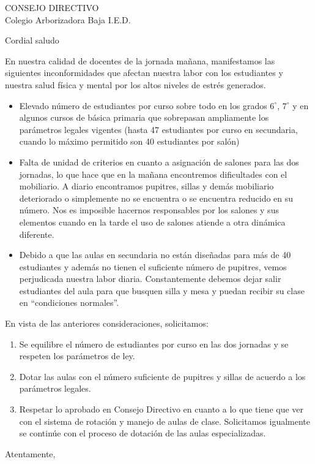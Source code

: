 \documentclass[spanish,11pt]{letter}
\date{26 de febrero de 2015}
\begin{document}
\begin{letter}{CONSEJO DIRECTIVO\\Colegio Arborizadora Baja I.E.D.}
	
\opening{Cordial saludo}
En nuestra calidad de docentes de la jornada mañana, manifestamos las siguientes inconformidades que afectan nuestra labor con los estudiantes y nuestra salud física y mental por los altos niveles de estr\'{e}s generados.
\begin{itemize}
\item Elevado n\'{u}mero de estudiantes por curso sobre todo en los grados $6^{\circ}$, $7^{\circ}$ y en algunos cursos de básica primaria que sobrepasan ampliamente los par\'{a}metros legales vigentes (hasta 47 estudiantes por curso en secundaria, cuando lo m\'{a}ximo permitido son 40 estudiantes por sal\'{o}n)
\item Falta de unidad de criterios en cuanto a asignación de salones para las dos jornadas, lo que hace que en la mañana encontremos dificultades con el mobiliario. A diario encontramos pupitres, sillas y demás mobiliario deteriorado o simplemente no se encuentra o se encuentra reducido en su número. Nos es imposible hacernos responsables por los salones y sus elementos cuando en la tarde el uso de salones atiende a otra dinámica diferente.
\item Debido a que las aulas en secundaria no están diseñadas para más de 40 estudiantes y además no tienen el suficiente número de pupitres, vemos perjudicada nuestra labor diaria. Constantemente debemos dejar salir estudiantes del aula para que busquen silla y mesa y puedan recibir su clase en ``condiciones normales''.
\end{itemize}
En vista de las anteriores consideraciones, solicitamos: 
\begin{enumerate}
\item Se equilibre el número de estudiantes por curso en las dos jornadas y se respeten los parámetros de ley.
\item Dotar las aulas con el número suficiente de pupitres y sillas de acuerdo a los parámetros legales.
\item Respetar lo aprobado en Consejo Directivo en cuanto a lo que tiene que ver con el sistema de rotación y manejo de aulas de clase. Solicitamos igualmente se continúe con el proceso de  dotación de las aulas especializadas.
\end{enumerate}

\closing{Atentamente,}


\end{letter}
\end{document}
